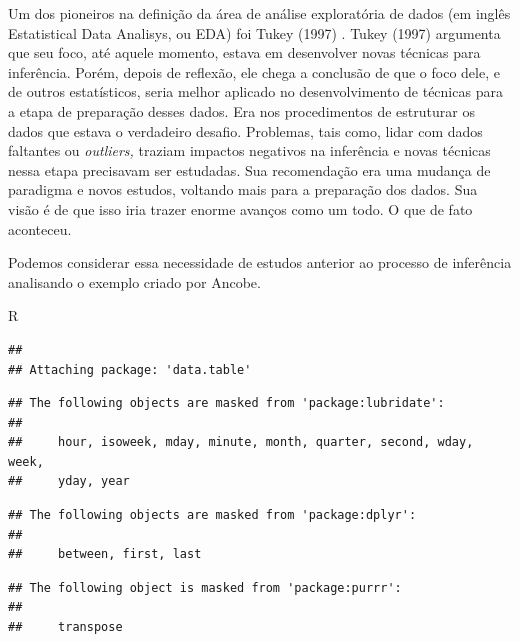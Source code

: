 \documentclass[
]{book}
\begin{document}
Um dos pioneiros na definição da área de análise exploratória de dados (em inglês Estatistical Data Analisys, ou EDA) foi Tukey (1997) \citep{tukey1977exploratory}. Tukey (1997) argumenta que seu foco, até aquele momento, estava em desenvolver novas técnicas para inferência. Porém, depois de reflexão, ele chega a conclusão de que o foco dele, e de outros estatísticos, seria melhor aplicado no desenvolvimento de técnicas para a etapa de preparação desses dados. Era nos procedimentos de estruturar os dados que estava o verdadeiro desafio. Problemas, tais como, lidar com dados faltantes ou \emph{outliers,} traziam impactos negativos na inferência e novas técnicas nessa etapa precisavam ser estudadas. Sua recomendação era uma mudança de paradigma e novos estudos, voltando mais para a preparação dos dados. Sua visão é de que isso iria trazer enorme avanços como um todo. O que de fato aconteceu.

Podemos considerar essa necessidade de estudos anterior ao processo de inferência analisando o exemplo criado por Ancobe.

R

\begin{verbatim}
## 
## Attaching package: 'data.table'
\end{verbatim}

\begin{verbatim}
## The following objects are masked from 'package:lubridate':
## 
##     hour, isoweek, mday, minute, month, quarter, second, wday, week,
##     yday, year
\end{verbatim}

\begin{verbatim}
## The following objects are masked from 'package:dplyr':
## 
##     between, first, last
\end{verbatim}

\begin{verbatim}
## The following object is masked from 'package:purrr':
## 
##     transpose
\end{verbatim}
\end{document}
